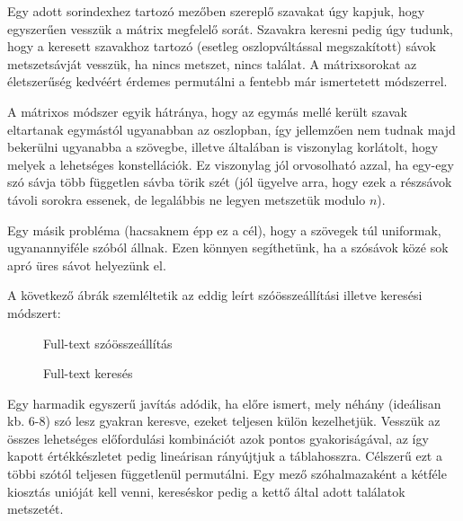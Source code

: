\documentclass[
    parspace,
    noindent,
    nohyp,
]{elteiktdk}[2023/04/10]
\begin{document}
Egy adott sorindexhez tartozó mezőben szereplő szavakat úgy kapjuk,
hogy egyszerűen vesszük a mátrix megfelelő sorát.
Szavakra keresni pedig úgy tudunk, hogy a keresett szavakhoz tartozó
(esetleg oszlopváltással megszakított) sávok metszetsávját vesszük,
ha nincs metszet, nincs találat.
A mátrixsorokat az életszerűség kedvéért érdemes permutálni a fentebb már ismertetett módszerrel.

A mátrixos módszer egyik hátránya,
hogy az egymás mellé került szavak eltartanak egymástól ugyanabban az oszlopban,
így jellemzően nem tudnak majd bekerülni ugyanabba a szövegbe,
illetve általában is viszonylag korlátolt,
hogy melyek a lehetséges konstellációk.
Ez viszonylag jól orvosolható azzal, ha egy-egy szó sávja több független sávba törik szét
(jól ügyelve arra, hogy ezek a részsávok távoli sorokra essenek,
de legalábbis ne legyen metszetük modulo $n$).

Egy másik probléma (hacsaknem épp ez a cél), hogy a szövegek túl uniformak, ugyanannyiféle szóból állnak.
Ezen könnyen segíthetünk, ha a szósávok közé sok apró üres sávot helyezünk el.

A következő ábrák szemléltetik az eddig leírt szóösszeállítási illetve keresési módszert:

\begin{figure}[H]
  \centering
  \hspace*{\fill}
  \begin{minipage}[t]{0.42\textwidth}
    
    \caption{Full-text szóösszeállítás}
  \end{minipage}
  \hspace*{\fill}
  \begin{minipage}[t]{0.42\textwidth}
    
    \caption{Full-text keresés}
  \end{minipage}
  \hspace*{\fill}
\end{figure}

Egy harmadik egyszerű javítás adódik,
ha előre ismert, mely néhány (ideálisan kb. 6-8) szó lesz gyakran keresve,
ezeket teljesen külön kezelhetjük.
Vesszük az összes lehetséges előfordulási kombinációt azok pontos gyakoriságával,
az így kapott értékkészletet pedig lineárisan rányújtjuk a táblahosszra.
Célszerű ezt a többi szótól teljesen függetlenül permutálni.
Egy mező szóhalmazaként a kétféle kiosztás unióját kell venni,
kereséskor pedig a kettő által adott találatok metszetét.
\end{document}
